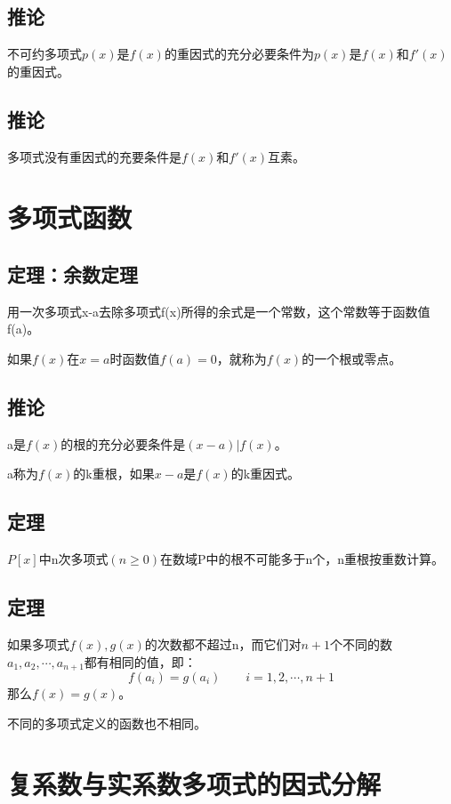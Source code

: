 \documentclass{article}%
\begin{document}
\subsection{推论}
不可约多项式$p(x)$是$f(x)$的重因式的充分必要条件为$p(x)$是$f(x)$和$ f'(x) $的重因式。

\subsection{推论}
多项式没有重因式的充要条件是$f(x)$和$ f'(x) $互素。


\section{多项式函数}
\subsection{定理：余数定理}
用一次多项式x-a去除多项式f(x)所得的余式是一个常数，这个常数等于函数值f(a)。
\\ \hspace*{\fill}

如果$ f(x) $在$ x=a $时函数值$ f(a)=0 $，就称为$ f(x) $的一个根或零点。

\subsection{推论}
a是$ f(x) $的根的充分必要条件是$ (x-a)|f(x) $。
\\ \hspace*{\fill}

a称为$ f(x) $的k重根，如果$ x-a $是$ f(x) $的k重因式。

\subsection{定理}
$ P[x] $中n次多项式$ (n\ge0) $在数域P中的根不可能多于n个，n重根按重数计算。

\subsection{定理}
如果多项式$ f(x),g(x) $的次数都不超过n，而它们对$ n+1 $个不同的数$ a_1,a_2,\cdots,a_{n+1} $都有相同的值，即：
\[
f(a_i)=g(a_i)\qquad i=1,2,\cdots,n+1
\]
那么$ f(x)=g(x) $。
\\ \hspace*{\fill}

不同的多项式定义的函数也不相同。


\section{复系数与实系数多项式的因式分解}
\end{document}
